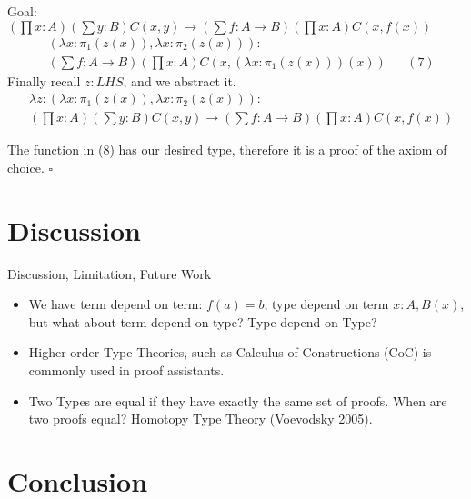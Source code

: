\documentclass{beamer}
\theoremstyle{plain}
\begin{document}
\begin{frame}{Goal: $(\prod x: A)(\sum {y: B})C(x, y)\to(\sum{f: A\to B})(\prod{x: A})C(x, f(x))$}
      \begin{align*}
        &(\lambda x: \pi_{1}(z(x)), \lambda x:\pi_{2}(z(x))):\nonumber\\
        &(\sum f:A\to B)(\prod x:A)C(x, (\lambda x:\pi_{1}(z(x)))(x))&&(7)
      \end{align*}
    Finally recall $z: LHS$, and we abstract it.
    \begin{align}
    &\lambda z: (\lambda x: \pi_{1}(z(x)), \lambda x:\pi_{2}(z(x))):\nonumber\\
    &(\prod x: A)(\sum {y: B})C(x, y)\to(\sum{f: A\to B})(\prod{x: A})C(x, f(x))
    \end{align}

    The function in (8) has our desired type, therefore it is a proof of the axiom of choice.
    $\square$
\end{frame}

\section{Discussion}
\begin{frame}{Discussion, Limitation, Future Work}
\begin{itemize}
  \item We have term depend on term: $f(a) = b$, type depend on term
        $x: A, B(x)$, but what about term depend on type? Type depend on Type?
        \pause
  \item Higher-order Type Theories, such as Calculus of Constructions (CoC) is
        commonly used in proof assistants.
        \pause
    \item Two Types are equal if they have exactly the same set of proofs. When
    are two proofs equal? \pause Homotopy Type Theory (Voevodsky 2005).
\end{itemize}
\end{frame}

\section{Conclusion}
\begin{frame}
\end{frame}
\end{document}
